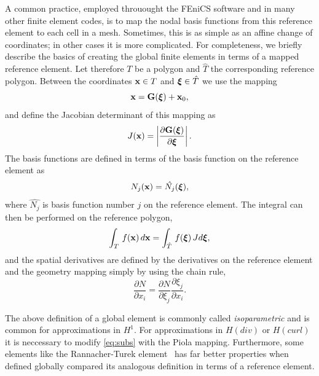 A common practice, employed throuought the FEniCS
software and in many other finite element codes, is to map the nodal
basis functions from this reference element to each cell in a mesh.
Sometimes, this is as simple as an affine change of coordinates; in
other cases it is more complicated.
For completeness, we briefly describe the basics of creating the global finite elements in terms of a mapped
reference element. Let therefore $T$ be a polygon and $\hat{T}$ the corresponding reference polygon.
Between the coordinates
$\mathbf{x}\in T$ and ${\mbox{\boldmath $\xi$}}\in\hat T$ we use the mapping 
\begin{equation}
\label{eq:geometry}
\mathbf{x} = \mathbf{G}({\mbox{\boldmath $\xi$}}) + \mathbf{x}_0,
\end{equation}
and define the Jacobian determinant of this mapping as
\begin{equation}
\label{eq:geometry2}
J(\mathbf{x}) = \left| \frac{\partial\mathbf{G}({\mbox{\boldmath $\xi$}}) }{\partial {\mbox{\boldmath $\xi$}}} \right| .
\end{equation}
The basis functions are defined in terms of the basis function
on the reference element as
\begin{equation}
\label{eq:subs}
N_j(\mathbf{x}) = \hat{N_j}({\mbox{\boldmath $\xi$}}), 
\end{equation}
where $\hat{N_j}$ is basis function number $j$ on the reference element. 
The integral can then be performed on the reference polygon, 
\begin{equation}
\label{eq:integration2}
\int_T \, f(\mathbf{x}) \, d\mathbf{x} = \int_{\hat{T}} \, f({\mbox{\boldmath $\xi$}}) \, J d{\mbox{\boldmath $\xi$}} ,
\end{equation}
and the spatial derivatives are defined by the derivatives on the
reference element and the geometry mapping simply by using the
chain rule, 
\begin{equation}
\label{eq:chain}
\frac{\partial N}{\partial x_i} = 
\frac{\partial N}{\partial \xi_j} \frac{\partial \xi_j }{\partial x_i }  .
\end{equation}

The above definition of a global element is commonly called \emph{isoparametric}
and is common for approximations in $H^1$. For approximations in $H(div)$ or
$H(curl)$ it is neccessary to modify \eqref{eq:subs} with the Piola mapping.  
Furthermore, some elements like the Rannacher-Turek element~\cite{TurekBook,rannacher-turek} has far better
properties when defined globally compared its analogous definition in terms
of a reference element. 


